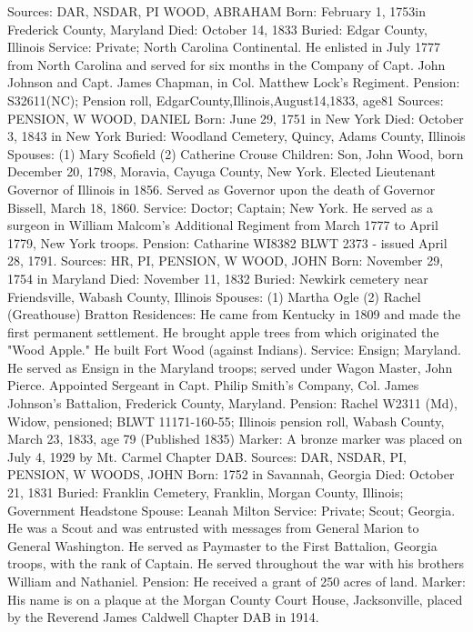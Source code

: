 Sources: DAR, NSDAR, PI 
WOOD, ABRAHAM 
Born: February 1, 1753in Frederick County, Maryland
Died: October 14, 1833 
Buried: Edgar County, Illinois 
Service: Private; North Carolina Continental.  He enlisted in July 1777 from North Carolina and served for six months in the Company of Capt. John Johnson and Capt. James Chapman, in Col. Matthew Lock's Regiment. 
Pension: S32611(NC); Pension roll, EdgarCounty,Illinois,August14,1833, age81 
Sources: PENSION, W 
WOOD, DANIEL 
Born: June 29, 1751 in New York 
Died: October 3, 1843 in New York 
Buried: Woodland Cemetery, Quincy, Adams County, Illinois 
Spouses:  (1) Mary Scofield 
	  (2) Catherine Crouse 
Children: Son, John Wood, born December 20, 1798, Moravia, Cayuga County, New York. Elected Lieutenant Governor of Illinois in 1856. Served as Gov­ernor upon the death of Governor Bissell, March 18, 1860. 
Service: Doctor; Captain; New York. He served as a surgeon in William Mal­com's Additional Regiment from March 1777 to April 1779, New York troops. 
Pension: Catharine WI8382 BLWT 2373 - issued April 28, 1791. 
Sources: HR, PI, PENSION, W 
WOOD, JOHN 
Born: November 29, 1754 in Maryland 
Died: November 11, 1832 
Buried: Newkirk cemetery near Friendsville, Wabash County, Illinois 
Spouses:  (1) Martha Ogle
	  (2) Rachel (Greathouse) Bratton 
Residences: He came from Kentucky in 1809 and made the first permanent settle­ment. He brought apple trees from which originated the "Wood Apple." He built Fort Wood (against Indians). 
Service: Ensign; Maryland. He served as Ensign in the Maryland troops; served under Wagon Master, John Pierce. Appointed Sergeant in Capt. Philip Smith's Company, Col. James Johnson's Battalion, Frederick County, Maryland. 
Pension: Rachel W2311 (Md), Widow, pensioned; BLWT 11171-160-55; Illinois pension roll, Wabash County, March 23, 1833, age 79 (Published 1835) 
Marker: A bronze marker was placed on July 4, 1929 by Mt. Carmel Chapter DAB. 
Sources: DAR, NSDAR, PI, PENSION, W 
WOODS, JOHN 
Born: 1752 in Savannah, Georgia 
Died: October 21, 1831 
Buried: Franklin Cemetery, Franklin, Morgan County, Illinois; Government Head­stone 
Spouse:  Leanah Milton 
Service: Private; Scout; Georgia. He was a Scout and was entrusted with mes­sages from General Marion to General Washington. He served as Paymaster to the First Battalion, Georgia troops, with the rank of Captain. He served throughout the war with his brothers William and Nathaniel. 
Pension: He received a grant of 250 acres of land. 
Marker: His name is on a plaque at the Morgan County Court House, Jackson­ville, placed by the Reverend James Caldwell Chapter DAB in 1914. 
